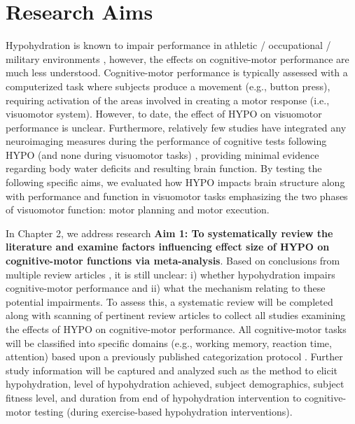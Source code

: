 
\section{Research Aims}
Hypohydration is known to impair performance in athletic / occupational / military environments \cite{iom_dietary_2004}, however, the effects on cognitive-motor performance are much less understood. Cognitive-motor performance is typically assessed with a computerized task where subjects produce a movement (e.g., button press), requiring activation of the areas involved in creating a motor response (i.e., visuomotor system). However, to date, the effect of HYPO on visuomotor performance is unclear. Furthermore, relatively few studies have integrated any neuroimaging measures during the performance of cognitive tests following HYPO (and none during visuomotor tasks) \cite{kempton_dehydration_2011,watson_mild_2015,szinnai_effect_2005}, providing minimal evidence regarding body water deficits and resulting brain function. By testing the following specific aims, we evaluated how HYPO impacts brain structure along with performance and function in visuomotor tasks emphasizing the two phases of visuomotor function: motor planning and motor execution. 


In Chapter 2, we address research \textbf{Aim 1: To systematically review the literature and examine factors influencing effect size of HYPO on cognitive-motor functions via meta-analysis}. Based on conclusions from multiple review articles \cite{masento_effects_2014,lieberman_hydration_2007,grandjean_dehydration_2007}, it is still unclear: i) whether hypohydration impairs cognitive-motor performance and ii) what the mechanism relating to these potential impairments. To assess this, a systematic review will be completed along with scanning of pertinent review articles to collect all studies examining the effects of HYPO on cognitive-motor performance. All cognitive-motor tasks will be classified into specific domains (e.g., working memory, reaction time, attention) based upon a previously published categorization protocol \cite{chang_effects_2012}. Further study information will be captured and analyzed such as the method to elicit hypohydration, level of hypohydration achieved, subject demographics, subject fitness level, and duration from end of hypohydration intervention to cognitive-motor testing (during exercise-based hypohydration interventions). 

